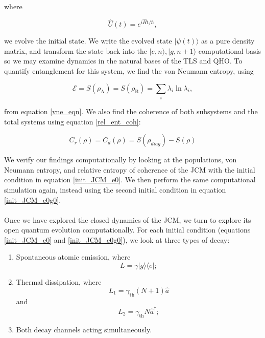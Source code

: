 \documentclass[12pt]{article}
\begin{document}
where 

\begin{equation*}
    \hat{U}(t) = e^{i\hat{H}t/\hbar},
\end{equation*}

we evolve the initial state. We write the evolved state $|\psi(t)\rangle$ as a pure density matrix, and transform the state back into the $|e, n\rangle, |g,n+1\rangle$ computational basis so we may examine dynamics in the natural bases of the TLS and QHO. To quantify entanglement for this system, we find the von Neumann entropy, using

\begin{equation*}
    \mathcal{E} = S(\rho_{\scriptscriptstyle \text{A}}) = S(\rho_{\scriptscriptstyle \text{B}}) = \sum_i \lambda_i\ln\lambda_i,
\end{equation*}

from equation \eqref{vne_eqn}. We also find the coherence of both subsystems and the total systems using equation \eqref{rel_ent_coh}:

\begin{equation*} 
C_r(\rho) = C_d(\rho) = S(\rho_{diag}) - S(\rho)
\end{equation*}

We verify our findings computationally by looking at the populations, von Neumann entropy, and relative entropy of coherence of the JCM with the initial condition in equation \eqref{init_JCM_e0}. We then perform the same computational simulation again, instead using the second initial condition in equation \eqref{init_JCM_e0g0}. \\
\\
Once we have explored the closed dynamics of the JCM, we turn to explore its open quantum evolution computationally. For each initial condition (equations \eqref{init_JCM_e0} and \eqref{init_JCM_e0g0}), we look at three types of decay:

\begin{enumerate}
    \item Spontaneous atomic emission, where 
    \begin{equation*}
        L = \gamma|g\rangle\langle e|;
    \end{equation*}
    \item Thermal dissipation, where
    \begin{equation*}
        L_1 = \gamma_{\scriptscriptstyle \text{th}}(N+1)\hat{a} 
    \end{equation*}
    and 
    \begin{equation*}
        L_2 = \gamma_{\scriptscriptstyle \text{th}}N\hat{a}^\dagger;
    \end{equation*}
    \item Both decay channels acting simultaneously.
\end{enumerate}
\end{document}
